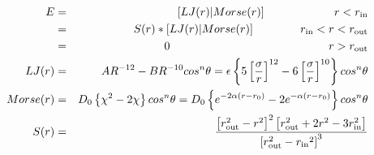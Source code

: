 

\begin{eqnarray*}
 E & = & \left[LJ(r) | Morse(r) \right] \qquad \qquad \qquad r < r_{\rm in} \\
   & = & S(r) * \left[LJ(r) | Morse(r) \right] \qquad \qquad r_{\rm in} < r < r_{\rm out} \\
   & = & 0 \qquad \qquad \qquad \qquad \qquad \qquad \qquad r > r_{\rm out} \\
 LJ(r) & = & AR^{-12}-BR^{-10}cos^n\theta=
         \epsilon\left\lbrace 5\left[ \frac{\sigma}{r}\right]^{12}-
         6\left[ \frac{\sigma}{r}\right]^{10}  \right\rbrace cos^n\theta\\
 Morse(r) & = & D_0\left\lbrace \chi^2 - 2\chi\right\rbrace cos^n\theta=
         D_{0}\left\lbrace e^{- 2 \alpha (r - r_0)} - 2 e^{- \alpha (r - r_0)} 
         \right\rbrace cos^n\theta \\
 S(r) & = & \frac{ \left[r_{\rm out}^2 - r^2\right]^2  
   \left[r_{\rm out}^2 + 2r^2 - 3{r_{\rm in}^2}\right]} 
 { \left[r_{\rm out}^2 - {r_{\rm in}}^2\right]^3 }
\end{eqnarray*}


